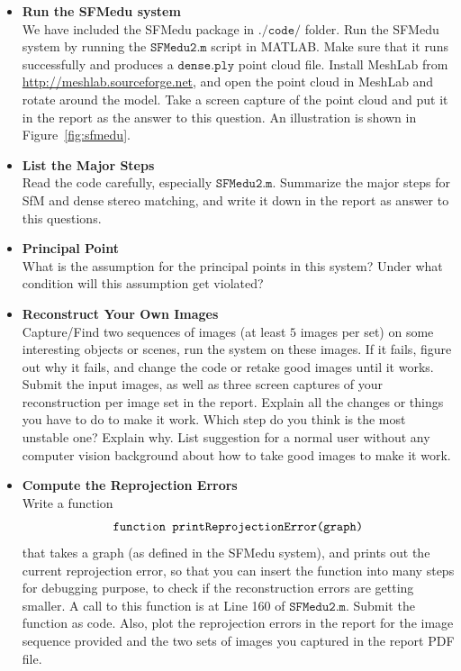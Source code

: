 \documentclass[11pt]{article}
\begin{document}
\begin{itemize}
\item{{\bf{Run the SFMedu system}}\\
We have included the SFMedu package in $\texttt{./code/}$ folder. Run the SFMedu system by running the $\texttt{SFMedu2.m}$ script in MATLAB. Make sure that it runs successfully and produces a $\texttt{dense.ply}$ point cloud file. Install MeshLab from \url{http://meshlab.sourceforge.net}, and open the point cloud in MeshLab and rotate around the model. Take a screen capture of the point cloud and put it in the report as the answer to this question. An illustration is shown in Figure~\ref{fig:sfmedu}.}

\item{{\bf{List the Major Steps}}\\
Read the code carefully, especially $\texttt{SFMedu2.m}$. Summarize the major steps for SfM and dense stereo matching, and write it down in the report as answer to this questions.}

\item{{\bf{Principal Point}}\\
What is the assumption for the principal points in this system? Under what condition will this assumption get violated?}

\item{{\bf{Reconstruct Your Own Images}}\\
Capture/Find two sequences of images (at least $5$ images per set) on some interesting objects or scenes, run the system on these images. If it fails, figure out why it fails, and change the code or retake good images until it works. Submit the input images, as well as three screen captures of your reconstruction per image set in the report. Explain all the changes or things you have to do to make it work. Which step do you think is the most unstable one? Explain why. List suggestion for a normal user without any computer vision background about how to take good images to make it work.}

\item{{\bf{Compute the Reprojection Errors}}\\
Write a function\vspace{-0.05in}
$$\texttt{function printReprojectionError(graph)}\vspace{-0.05in}$$
that takes a graph (as defined in the SFMedu system), and prints out the current reprojection error, so that you can insert the function into many steps for debugging purpose, to check if the reconstruction errors are getting smaller. A call to this function is at Line 160 of $\texttt{SFMedu2.m}$. Submit the function as code. Also, plot the reprojection errors in the report for the image sequence provided and the two sets of images you captured in the report PDF file.}


\end{itemize}
\end{document}
